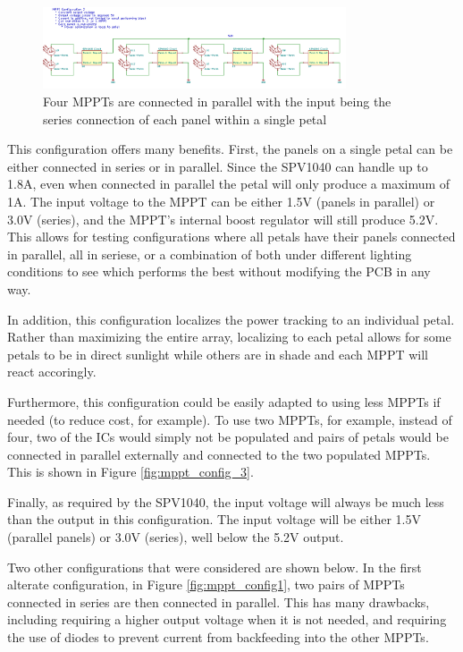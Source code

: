 \documentclass{article}
\numberwithin{figure}{section}
\numberwithin{equation}{section}
\begin{document}
{\begin{figure}[H]
  \centering
  \includegraphics[width=0.8\textwidth]{MPPTConfig2}
  \caption{Four MPPTs are connected in parallel with the input being the series connection of each panel within a single petal}
  \label{fig:mppt_config2}
\end{figure}

This configuration offers many benefits. First, the panels on a single petal can be either connected in series or in parallel. Since the SPV1040 can handle up to 1.8A, even when connected in parallel the petal will only produce a maximum of 1A. The input voltage to the MPPT can be either 1.5V (panels in parallel) or 3.0V (series), and the MPPT's internal boost regulator will still produce 5.2V. This allows for testing configurations where all petals have their panels connected in parallel, all in seriese, or a combination of both under different lighting conditions to see which performs the best without modifying the PCB in any way.

\bigskip
In addition, this configuration localizes the power tracking to an individual petal. Rather than maximizing the entire array, localizing to each petal allows for some petals to be in direct sunlight while others are in shade and each MPPT will react accoringly.

\bigskip
Furthermore, this configuration could be easily adapted to using less MPPTs if needed (to reduce cost, for example). To use two MPPTs, for example, instead of four, two of the ICs would simply not be populated and pairs of petals would be connected in parallel externally and connected to the two populated MPPTs. This is shown in Figure \ref{fig:mppt_config_3}.

\bigskip
Finally, as required by the SPV1040, the input voltage will always be much less than the output in this configuration. The input voltage will be either 1.5V (parallel panels) or 3.0V (series), well below the 5.2V output.

\bigskip
Two other configurations that were considered are shown below. In the first alterate configuration, in Figure \ref{fig:mppt_config1}, two pairs of MPPTs connected in series are then connected in parallel. This has many drawbacks, including requiring a higher output voltage when it is not needed, and requiring the use of diodes to prevent current from backfeeding into the other MPPTs.

}
\end{document}
